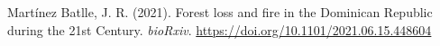\documentclass[10pt,landscape,a3paper]{article}
\newlength{\cslhangindent}
\newenvironment{CSLReferences}%
{\setlength{\parindent}{0pt}%
\everypar{\setlength{\hangindent}{\cslhangindent}}\ignorespaces}%
{\par}
\begin{document}
\hypertarget{refs}{}
\begin{CSLReferences}{1}{0}
\leavevmode\hypertarget{ref-martinez2021forest}{}%
Martínez Batlle, J. R. (2021). {Forest loss and fire in the Dominican
Republic during the 21st Century}. \emph{bioRxiv}.
\url{https://doi.org/10.1101/2021.06.15.448604}

\end{CSLReferences}




\newpage
\singlespacing 
\end{document}
